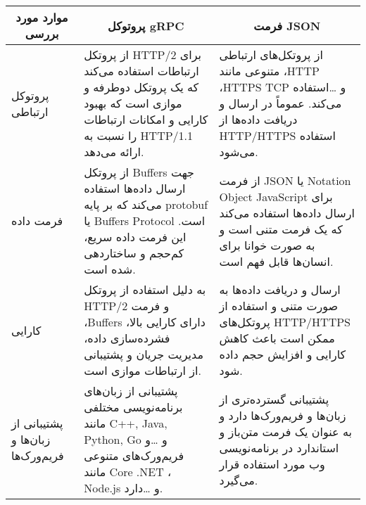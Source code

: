 \documentclass[a4paper,10pt]{article}
\begin{document}
    \begin{table}[t]
                        
        \centering
        \begin{tabularx}{\textwidth}{ p{}|p{}|p{} }
            
            \multicolumn{1}{c}{موارد مورد بررسی} &
            \multicolumn{1}{c}{پروتوکل gRPC} &
            \multicolumn{1}{c}{فرمت JSON} \\

            \hline

            \multicolumn{1}{l|}{پروتوکل ارتباطی}
            &
            از پروتکل HTTP/2 برای ارتباطات استفاده می‌کند که یک پروتکل دوطرفه و موازی است که بهبود کارایی و امکانات ارتباطات را نسبت به HTTP/1.1 ارائه می‌دهد.
            &
            از پروتکل‌های ارتباطی متنوعی مانند ،HTTP ،HTTPS TCP و \dots استفاده می‌کند. عموماً در ارسال و دریافت داده‌ها از HTTP/HTTPS استفاده می‌شود.
            \\

            \hline

            \multicolumn{1}{l|}{فرمت داده}
            &
            از پروتکل Buffers جهت ارسال داده‌ها استفاده می‌کند که بر پایه protobuf یا Buffers Protocol است. این فرمت داده سریع، کم‌حجم و ساختاردهی شده است.
            &
            از فرمت JSON یا Notation Object JavaScript برای ارسال داده‌ها استفاده می‌کند که یک فرمت متنی است و به صورت خوانا برای انسان‌ها قابل فهم است.
            \\

            \hline

            \multicolumn{1}{l|}{کارایی}
            &
            به دلیل استفاده از پروتکل HTTP/2 و فرمت ،Buffers دارای کارایی بالا، فشرده‌سازی داده، مدیریت جریان و پشتیبانی از ارتباطات موازی است.
            &
            ارسال و دریافت داده‌ها به صورت متنی و استفاده از پروتکل‌های HTTP/HTTPS ممکن است باعث کاهش کارایی و افزایش حجم داده شود.
            \\

            \hline

            \multicolumn{1}{l|}{پشتیبانی از زبان‌ها و فریم‌ورک‌ها}
            &
            پشتیبانی از زبان‌های برنامه‌نویسی مختلفی مانند C++, Java, Python, Go و \dots و فریم‌ورک‌های متنوعی مانند Core .NET ، Node.js و \dots دارد.
            &
            پشتیبانی گسترده‌تری از زبان‌ها و فریم‌ورک‌ها دارد و به عنوان یک فرمت متن‌باز و استاندارد در برنامه‌نویسی وب مورد استفاده قرار می‌گیرد.
            \\

        \end{tabularx}
    \end{table}
\end{document}
